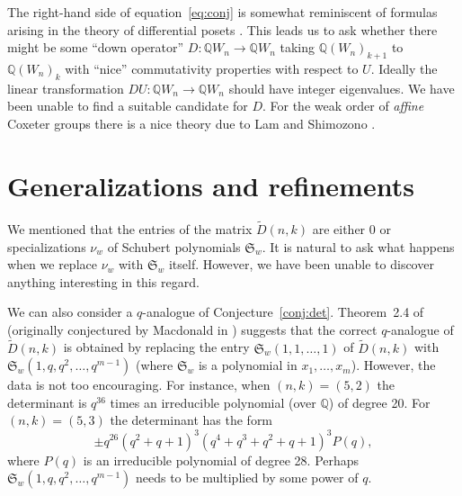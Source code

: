\documentclass[12pt]{amsart}
\theoremstyle{definition}
\theoremstyle{remark}
\numberwithin{equation}{section}
\begin{document}
The right-hand side of equation~\eqref{eq:conj} is somewhat
reminiscent of formulas arising in the theory of differential posets
\cite[Sect.~4]{rs:dp}
\cite[pp.~154--157]{rs:vdp}. This leads us to ask
whether there might be some ``down operator'' $D\colon {\mathbb{Q}} W_n
\to {\mathbb{Q}} W_n$ taking ${\mathbb{Q}} (W_n)_{k+1}$ to ${\mathbb{Q}} (W_n)_k$ with ``nice''
commutativity properties with respect to 
$U$.  Ideally the linear transformation $DU\colon {\mathbb{Q}} W_n\to
{\mathbb{Q}} W_n$ should have integer eigenvalues. We have been unable to find
a suitable candidate for $D$. For the weak order of \emph{affine}
Coxeter groups  there is a nice theory due to Lam and Shimozono
\cite{l-s}. 

\section{Generalizations and refinements}
We mentioned that the entries of the matrix $\tilde{D}(n,k)$ are
either 0 or specializations $\nu_w$ of Schubert polynomials
${\mathfrak{S}}_w$. It is natural to ask what happens when we replace $\nu_w$
with ${\mathfrak{S}}_w$ itself. However, we have been unable to discover anything
interesting in this regard.

We can also consider a $q$-analogue of
Conjecture~\ref{conj:det}. Theorem~2.4 of \cite{f-s} (originally
conjectured by Macdonald in \cite[(6.11$_q$?)]{macd}) suggests that
the correct $q$-analogue of $\tilde{D}(n,k)$ is obtained by replacing
the entry ${\mathfrak{S}}_w(1,1,\dots,1)$ of $\tilde{D}(n,k)$ with
${\mathfrak{S}}_w(1,q,q^2,\dots,q^{m-1})$ (where ${\mathfrak{S}}_w$ is a polynomial in
$x_1,\dots, x_m$). However, the data is not too  encouraging. For instance,
when $(n,k)=(5,2)$ the determinant is $q^{36}$ times an irreducible
polynomial (over ${\mathbb{Q}}$) of degree 20. For $(n,k)=(5,3)$ the
determinant has the form
  $$ \pm q^{26}(q^2+q+1)^3(q^4+q^3+q^2+q+1)^3 P(q), $$
where $P(q)$ is an irreducible polynomial of degree 28. Perhaps
${\mathfrak{S}}_w(1,q,q^2,\dots,q^{m-1})$ needs to be multiplied by some power of $q$.
\end{document}
